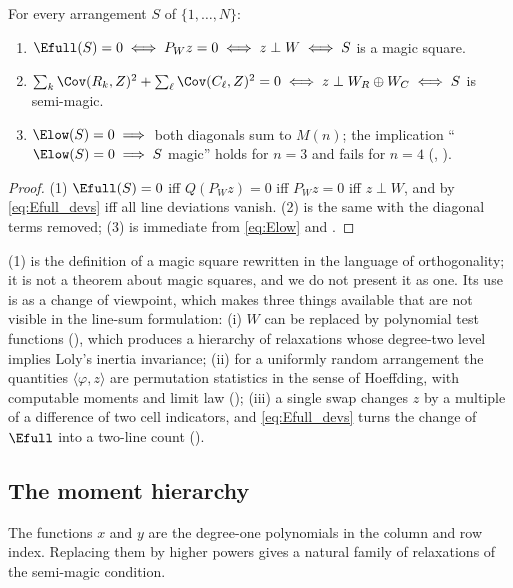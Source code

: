 \begin{lemma}
\label{lem:zero_set}
For every arrangement $S$ of $\{1,\dots,N\}$:
\begin{enumerate}
\item $\Efull(S)=0\iff P_Wz=0\iff z\perp W\iff S$ is a magic square.
\item $\sum_k\Cov(R_k,Z)^{2}+\sum_\ell\Cov(C_\ell,Z)^{2}=0\iff z\perp W_R\oplus W_C\iff S$ is semi-magic.
\item $\Elow(S)=0\implies$ both diagonals sum to $M(n)$; the implication
``$\Elow(S)=0\implies S$ magic'' holds for $n=3$ and fails for $n=4$ (, ).
\end{enumerate}
\end{lemma}

\begin{proof}
(1) $\Efull(S)=0$ iff $Q(P_Wz)=0$ iff $P_Wz=0$ iff $z\perp W$, and by \eqref{eq:Efull_devs} iff all line deviations vanish.
(2) is the same with the diagonal terms removed; (3) is immediate from \eqref{eq:Elow} and .
\end{proof}

\begin{remark}
\label{rem:tautology}
(1) is the definition of a magic square rewritten in the language of orthogonality; it is not a theorem
about magic squares, and we do not present it as one.  Its use is as a change of viewpoint, which makes three things available
that are not visible in the line-sum formulation: (i) $W$ can be replaced by polynomial test functions
(), which produces a hierarchy of relaxations whose degree-two level implies Loly's inertia
invariance; (ii) for a uniformly random arrangement the quantities $\langle\varphi,z\rangle$ are permutation statistics in the
sense of Hoeffding, with computable moments and limit law (); (iii) a single swap changes $z$ by a
multiple of a difference of two cell indicators, and \eqref{eq:Efull_devs} turns the change of $\Efull$ into a two-line count
().
\end{remark}

\subsection{The moment hierarchy}
\label{sec:theory_hierarchy}

The functions $x$ and $y$ are the degree-one polynomials in the column and row index.  Replacing them by
higher powers gives a natural family of relaxations of the semi-magic condition.

